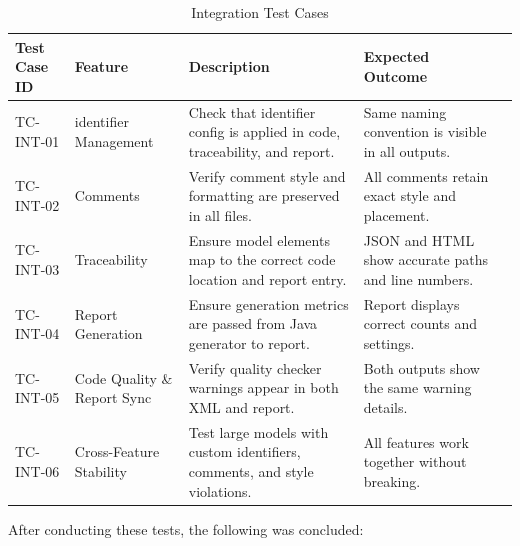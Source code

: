 \bgroup
{}
\begin{xltabular}{\textwidth}{X X X X X}
	\caption{Integration Test Cases}
	\label{tab:int_tests_1}\\
	\toprule
	Test Case ID & Feature & Description & Expected Outcome \\
	\midrule
	TC-INT-01 & \Gls{identifier} Management & Check that \gls{identifier} config is applied in code, traceability, and report. & Same naming convention is visible in all outputs. \\
	TC-INT-02 & Comments & Verify comment style and formatting are preserved in all files. & All comments retain exact style and placement. \\
	TC-INT-03 & Traceability & Ensure model elements map to the correct code location and report entry. & JSON and HTML show accurate paths and line numbers. \\
	TC-INT-04 & Report Generation & Ensure generation metrics are passed from Java generator to report. & Report displays correct counts and settings. \\
	TC-INT-05 & Code Quality \& Report Sync & Verify quality checker warnings appear in both XML and report. & Both outputs show the same warning details. \\
	TC-INT-06 & Cross-Feature Stability & Test large models with custom \glspl{identifier}, comments, and style violations. & All features work together without breaking. \\
\end{xltabular}

After conducting these tests, the following was concluded:

